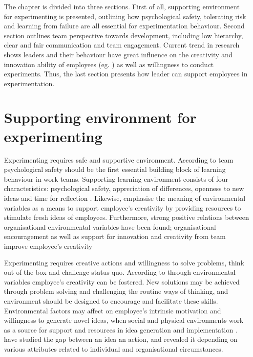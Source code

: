The chapter is divided into three sections. First of all, supporting environment for experimenting is presented, outlining how psychological safety, tolerating risk and learning from failure are all essential for experimentation behaviour. Second section outlines team perspective towards development, including low hierarchy, clear and fair communication and team engagement. Current trend in research shows leaders and their behaviour have great influence on the creativity and innovation ability of employees (eg. \citep{mumford2002leading,jung2001transformational,amabile1998kill}) as well as willingness to conduct experiments. Thus, the last section presents how leader can support employees in experimentation. 

\section{Supporting environment for experimenting}
Experimenting requires safe and supportive environment. According to \citet{edmondson1999psychological} team psychological safety should be the first essential building block of learning behaviour in work teams. Supporting learning environment consists of four characteristics: psychological safety, appreciation of differences, openness to new ideas and time for reflection \citep{garvin2008yours}. Likewise, \citet{mumford1988creativity} emphasise the meaning of environmental variables as a means to support employee's creativity by providing resources to stimulate fresh ideas of employees. Furthermore, strong positive relations between organisational environmental variables have been found; organisational encouragement as well as support for innovation and creativity from team improve employee's creativity \citep{amabile1996assessing}

Experimenting requires creative actions and willingness to solve problems, think out of the box and challenge status quo. According to \citet{mumford1988creativity} through environmental variables employee's creativity can be fostered. New solutions may be achieved through problem solving and challenging the routine ways of thinking, and environment should be designed to encourage and facilitate these skills. Environmental factors may affect on employee's intrinsic motivation and willingness to generate novel ideas, when social and physical environments work as a source for support and resources in idea generation and implementation \citep{amabile1998kill,mumford1988creativity}. \citet{mumford1988creativity} have studied the gap between an idea an action, and revealed it depending on various attributes related to individual and organisational circumstances.

